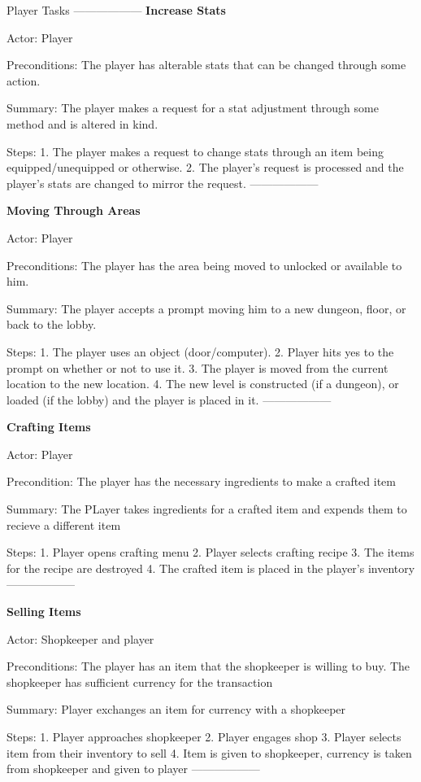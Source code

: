 \documentclass[12pt]{report}
\begin{document}
\begin {section}{Player Tasks}
------------------
\textbf {Increase Stats} %

Actor: Player

Preconditions: The player has alterable stats that can be changed through some action.

Summary: The player makes a request for a stat adjustment through some method and is altered in kind.

Steps:
1. The player makes a request to change stats through an item being equipped/unequipped or otherwise.
2. The player's request is processed and the player's stats are changed to mirror the request.
------------------

\textbf {Moving Through Areas} %

Actor: Player

Preconditions: The player has the area being moved to unlocked or available to him.

Summary: The player accepts a prompt moving him to a new dungeon, floor, or back to the lobby.

Steps:
1. The player uses an object (door/computer).
2. Player hits yes to the prompt on whether or not to use it.
3. The player is moved from the current location to the new location.
4. The new level is constructed (if a dungeon), or loaded (if the lobby) and the player is placed in it.
------------------

\textbf{Crafting Items} %

Actor: Player

Precondition: The player has the necessary ingredients to make a crafted item

Summary: The PLayer takes ingredients for a crafted item and expends them to recieve a different item

Steps:
1. Player opens crafting menu
2. Player selects crafting recipe
3. The items for the recipe are destroyed
4. The crafted item is placed in the player's inventory
------------------

\textbf{Selling Items} %

Actor: Shopkeeper and player

Preconditions: The player has an item that the shopkeeper is willing to buy. The shopkeeper has sufficient
currency for the transaction

Summary: Player exchanges an item for currency with a shopkeeper

Steps: 
1. Player approaches shopkeeper
2. Player engages shop
3. Player selects item from their inventory to sell
4. Item is given to shopkeeper, currency is taken from shopkeeper and given to player
------------------


\end{section}
\end{document}
